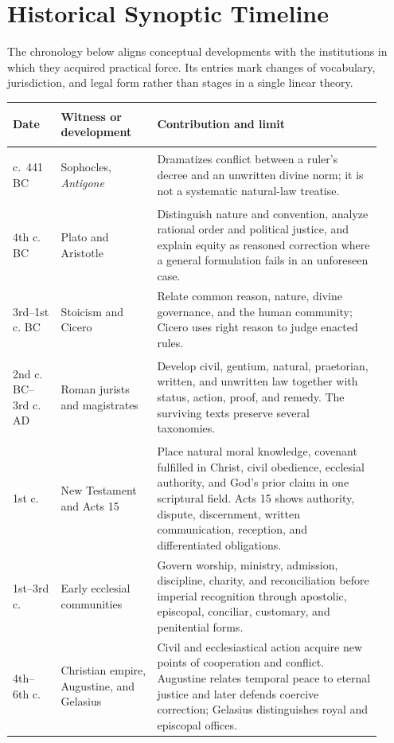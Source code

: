 \section{Historical Synoptic Timeline}

The chronology below aligns conceptual developments with the institutions in which they acquired practical force. Its entries mark changes of vocabulary, jurisdiction, and legal form rather than stages in a single linear theory.

\begin{longtable}{>{\bfseries\raggedright\arraybackslash}p{0.12\linewidth}>{\raggedright\arraybackslash}p{0.24\linewidth}>{\raggedright\arraybackslash}p{0.56\linewidth}}
\toprule
\textbf{Date} & \textbf{Witness or development} & \textbf{Contribution and limit}\\
\midrule
\endhead
c.~441 BC & Sophocles, \emph{Antigone} & Dramatizes conflict between a ruler's decree and an unwritten divine norm; it is not a systematic natural-law treatise.\\
4th c. BC & Plato and Aristotle & Distinguish nature and convention, analyze rational order and political justice, and explain equity as reasoned correction where a general formulation fails in an unforeseen case.\\
3rd--1st c. BC & Stoicism and Cicero & Relate common reason, nature, divine governance, and the human community; Cicero uses right reason to judge enacted rules.\\
2nd c. BC--3rd c. AD & Roman jurists and magistrates & Develop civil, gentium, natural, praetorian, written, and unwritten law together with status, action, proof, and remedy. The surviving texts preserve several taxonomies.\\
1st c. & New Testament and Acts 15 & Place natural moral knowledge, covenant fulfilled in Christ, civil obedience, ecclesial authority, and God's prior claim in one scriptural field. Acts 15 shows authority, dispute, discernment, written communication, reception, and differentiated obligations.\\
1st--3rd c. & Early ecclesial communities & Govern worship, ministry, admission, discipline, charity, and reconciliation before imperial recognition through apostolic, episcopal, conciliar, customary, and penitential forms.\\
4th--6th c. & Christian empire, Augustine, and Gelasius & Civil and ecclesiastical action acquire new points of cooperation and conflict. Augustine relates temporal peace to eternal justice and later defends coercive correction; Gelasius distinguishes royal and episcopal offices.\\

\end{longtable}
